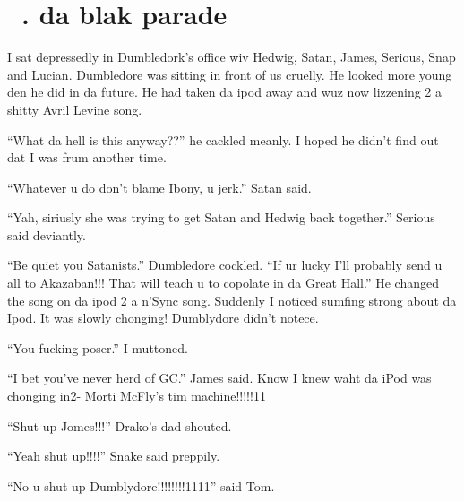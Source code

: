 \section{\chaptername~\thesection. da blak parade}

\begin{sloppypar}
\end{sloppypar}


I sat depressedly in Dumbledork's office wiv Hedwig, Satan, James, Serious, Snap and Lucian. Dumbledore was sitting in front of us cruelly. He looked more young den he did in da future. He had taken da ipod away and wuz now lizzening 2 a shitty Avril Levine song.

\enquote{What da hell is this anyway??} he cackled meanly. I hoped he didn't find out dat I was frum another time.

\enquote{Whatever u do don't blame Ibony, u jerk.} Satan said.

\enquote{Yah, siriusly she was trying to get Satan and Hedwig back together.} Serious said deviantly.

\enquote{Be quiet you Satanists.} Dumbledore cockled. \enquote{If ur lucky I'll probably send u all to Akazaban!!! That will teach u to copolate in da Great Hall.} He changed the song on da ipod 2 a n'Sync song. Suddenly I noticed sumfing strong about da Ipod. It was slowly chonging! Dumblydore didn't notece.

\enquote{You fucking poser.} I muttoned.

\enquote{I bet you've never herd of GC.} James said. Know I knew waht da iPod was chonging in2- Morti McFly's tim machine!!!!!11

\enquote{Shut up Jomes!!!} Drako's dad shouted.

\enquote{Yeah shut up!!!!} Snake said preppily.

\enquote{No u shut up Dumblydore!!!!!!!!1111} said Tom.


